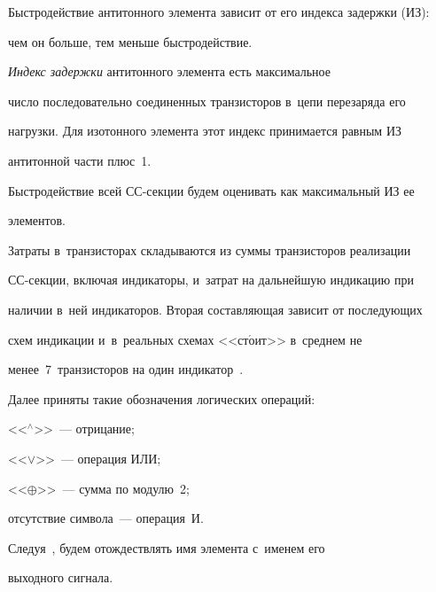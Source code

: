    


   Быстродействие антитонного элемента зависит от его индекса задержки (ИЗ): 


чем он больше, тем меньше быстродействие.


   


   \textit{Индекс задержки} антитонного элемента есть максимальное 


число последовательно соединенных транзисторов в~цепи перезаряда его 


нагрузки. Для изотонного элемента этот индекс принимается равным ИЗ 


антитонной части плюс~1.


   


   Быстродействие всей СС-секции будем оценивать как максимальный ИЗ ее 


элементов.


   


   Затраты в~транзисторах складываются из суммы транзисторов реализации 


СС-сек\-ции, включая индикаторы, и~затрат на дальнейшую индикацию при 


наличии в~ней индикаторов. Вторая составляющая зависит от последующих 


схем индикации и~в~реальных схемах <<ст$\acute{\mbox{о}}$ит>> в~среднем не 


менее~7~транзисторов на один индикатор~\cite{6-pl}.


   


   Далее приняты такие обозначения логических операций:


   <<$^\wedge$>>~--- отрицание;


   <<$\vee$>>~--- операция ИЛИ;


   <<$\oplus$>>~--- сумма по модулю~2;


   отсутствие символа~--- операция~И.


   


   Следуя~\cite{1-pl}, будем отождествлять имя элемента с~именем его 


выходного сигнала.





\vspace*{-5pt}


